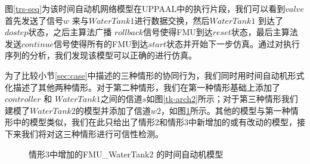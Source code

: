 图\ref{trs-seq}为该时间自动机网络模型在UPPAAL中的执行片段，我们可以看到$valve$首先发送了信号$w$ 来与$WaterTank1$进行数据交换，然后$WaterTank1$ 到达了 $dostep$状态，之后主算法广播  $rollback$信号使得FMU到达$reset$状态，最后主算法发送$continue$信号使得所有的FMU到达$start$状态并开始下一步仿真。通过对执行序列的分析，我们发现该模型可以正确的进行仿真。

为了比较小节\ref{sec:case}中描述的三种情形的协同行为，我们同时用时间自动机形式化描述了其他两种情形。对于第二种情形，我们在第一种情形基础上添加了$controller$ 和 $WaterTank1$之间的信道$s$如图\ref{tk-arch2}所示；对于第三种情形我们建模了$WaterTank2$的模型并添加了信道$w2$，如图\ref{arc3}所示。其他的模型与第一种情形中的模型类似，我们在此只给出了情形2和情形3中新增加的或有改动的模型，接下来我们将对这三种情形进行可信性检测。
\begin{figure}[htbp]
\end{figure}
\begin{figure}[htbp]
	\caption{情形3中增加的FMU\_WaterTank2 的时间自动机模型}\label{arc3}
\end{figure}

